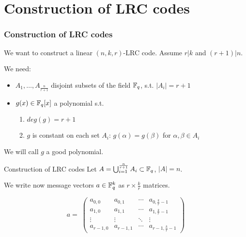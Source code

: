 \section{Construction of LRC codes}

\begin{frame}
        \frametitle{Construction of LRC codes}
        We want to construct a linear $(n,k,r)$-LRC code. Assume $r \vert k$ and $(r+1) \vert n$.
        
        We need:
        
        \begin{itemize}
            \item $A_1 , \dots , A_{\frac{n}{r+1}}$ disjoint subsets of the field $\mathbb{F}_q$, s.t. $\vert A_i \vert = r+1$
            \item $g(x) \in \mathbb{F}_q[x]$ a polynomial s.t.
            \begin{enumerate}
                \item $deg(g) = r+1$
                \item $g$ is constant on each set $A_i$: $g(\alpha) = g(\beta)$ for $\alpha, \beta \in A_i$
            \end{enumerate}
        \end{itemize}                
        We will call $g$ a good polynomial.
        
    \end{frame}
    
    \begin{frame}{Construction of LRC codes}
        Let $A= \bigcup_{i=1}^{\frac{n}{r+1}} A_i \subset \mathbb{F}_q$, $\vert A \vert = n$.
        
        We write now message vectors $a \in \mathbb{F}_q^k$ as $r \times \frac{k}{r}$ matrices.
        
        $$ a = \;
        \begin{pmatrix}
            a_{0,0} & a_{0,1} & \cdots & a_{0,\frac{k}{r}-1} \\
            a_{1,0} & a_{1,1} & \cdots & a_{1,\frac{k}{r}-1} \\
            \vdots  & \vdots  & \ddots & \vdots \\
            a_{r-1,0} & a_{r-1,1} & \cdots & a_{r-1,\frac{k}{r}-1}
        \end{pmatrix}
        $$
    \end{frame}
    
